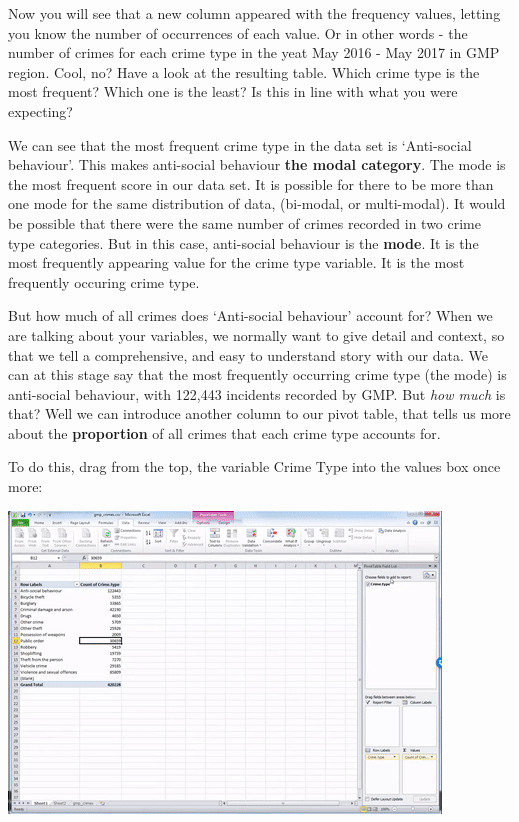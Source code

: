 \documentclass[]{book}
\theoremstyle{definition}
\theoremstyle{definition}
\theoremstyle{definition}
\theoremstyle{remark}
\begin{document}
Now you will see that a new column appeared with the frequency values,
letting you know the number of occurrences of each value. Or in other
words - the number of crimes for each crime type in the yeat May 2016 -
May 2017 in GMP region. Cool, no? Have a look at the resulting table.
Which crime type is the most frequent? Which one is the least? Is this
in line with what you were expecting?

We can see that the most frequent crime type in the data set is
`Anti-social behaviour'. This makes anti-social behaviour \textbf{the
modal category}. The mode is the most frequent score in our data set. It
is possible for there to be more than one mode for the same distribution
of data, (bi-modal, or multi-modal). It would be possible that there
were the same number of crimes recorded in two crime type categories.
But in this case, anti-social behaviour is the \textbf{mode}. It is the
most frequently appearing value for the crime type variable. It is the
most frequently occuring crime type.

But how much of all crimes does `Anti-social behaviour' account for?
When we are talking about your variables, we normally want to give
detail and context, so that we tell a comprehensive, and easy to
understand story with our data. We can at this stage say that the most
frequently occurring crime type (the mode) is anti-social behaviour,
with 122,443 incidents recorded by GMP. But \emph{how much} is that?
Well we can introduce another column to our pivot table, that tells us
more about the \textbf{proportion} of all crimes that each crime type
accounts for.

To do this, drag from the top, the variable Crime Type into the values
box once more:

\includegraphics{imgs/drag_perc_valu.gif}
\end{document}
